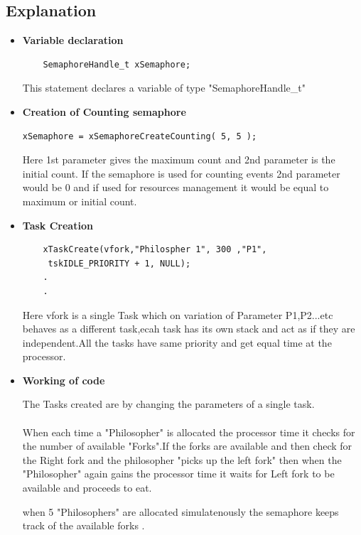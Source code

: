 \documentclass[11pt,a4paper]{book}
\begin{document}
\subsection{Explanation}
\begin{itemize}
	\item \textbf{Variable declaration}	
	
	\begin{lstlisting}
	SemaphoreHandle_t xSemaphore;
	\end{lstlisting}
	
	This statement declares a variable of type "SemaphoreHandle\_t"
	
	\item \textbf{Creation of Counting semaphore}
	
	\begin{lstlisting}
xSemaphore = xSemaphoreCreateCounting( 5, 5 );
	\end{lstlisting}
	
	Here 1st parameter gives the maximum count and 2nd parameter is the initial count.
	If the semaphore is used for counting events 2nd parameter would be 0 and if used for resources management it would be equal to maximum or initial count.
	\\
	\item \textbf{Task Creation }
	\begin{lstlisting}
	xTaskCreate(vfork,"Philospher 1", 300 ,"P1",
	 tskIDLE_PRIORITY + 1, NULL);
	.
	.
	\end{lstlisting}
	Here vfork is a single Task which on variation of Parameter P1,P2...etc behaves as a different task,ecah task has its own stack and act as if they are independent.All the tasks have same priority and get equal time at the processor.
	\\
	\item \textbf{Working of code}
	
	The Tasks created are by changing the parameters of a single task.
	\\
	\\
	When each time a "Philosopher" is allocated the processor time it checks for the number of available "Forks".If the forks are available and then check for the Right fork and the philosopher "picks up the left fork" then when the "Philosopher" again gains the processor time it waits for Left fork to be available and proceeds to eat.
	
	when 5 "Philosophers" are allocated simulatenously the semaphore keeps track of the available forks .
	

\end{itemize}
\end{document}

